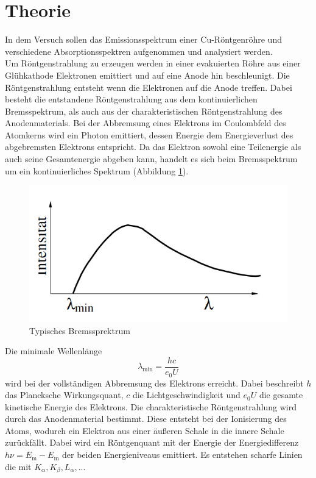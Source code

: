 \section{Theorie}
\label{sec:Theorie}
In dem Versuch sollen das Emissionsspektrum einer Cu-Röntgenröhre und verschiedene Absorptionsspektren aufgenommen und analysiert werden.
\\
Um Röntgenstrahlung zu erzeugen werden in einer evakuierten Röhre aus einer Glühkathode Elektronen emittiert und auf eine Anode hin beschleunigt. 
Die Röntgenstrahlung entsteht wenn die Elektronen auf die Anode treffen. Dabei besteht die entstandene Röntgenstrahlung aus dem kontinuierlichen
 Bremsspektrum, als auch aus der charakteristischen Röntgenstrahlung des Anodenmaterials. 
 Bei der Abbremsung eines Elektrons im Coulombfeld des Atomkerns wird ein Photon emittiert, dessen Energie dem Energieverlust des abgebremsten Elektrons entspricht.
 Da das Elektron sowohl eine Teilenergie als auch seine Gesamtenergie abgeben kann, handelt es sich beim Bremsspektrum um ein kontinuierliches Spektrum (Abbildung \ref{fig:Brems}).
 \begin{figure}
    \centering
    \caption{Typisches Bremssprektrum \cite{V602}}
    \label{fig:Brems}
    \includegraphics[width = 0.6 \textwidth]{pics/Bremsspe.png}
\end{figure}
 Die minimale Wellenlänge 
 \begin{equation}
     \lambda_\text{min}=\frac{h c}{e_0 U}
     \label{eqn:lammin}
 \end{equation}
 wird bei der vollständigen Abbremsung des Elektrons erreicht.
 Dabei beschreibt $h$ das Plancksche Wirkungsquant, $c$ die Lichtgeschwindigkeit und $e_0 U$ die gesamte kinetische Energie des Elektrons.
 Die charakteristische Röntgenstrahlung wird durch das Anodenmaterial bestimmt. Diese entsteht bei der Ionisierung des Atoms, wodurch ein Elektron aus einer äußeren Schale in die innere Schale zurückfällt.
 Dabei wird ein Röntgenquant mit der Energie der Energiedifferenz $h \nu = E_\text{m}-E_\text{m}$ der beiden Energieniveaus emittiert. Es entstehen scharfe Linien die mit $K_\alpha, K_\beta, L_\alpha, ...$ 
